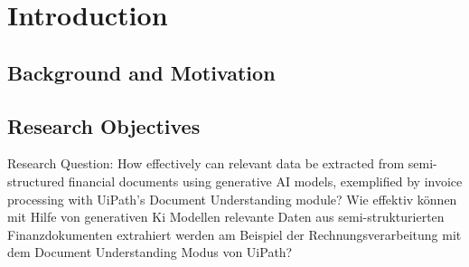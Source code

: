 \chapter{Introduction}

\section{Background and Motivation}
\section{Research Objectives}
Research Question:  
How effectively can relevant data be extracted from semi-structured financial documents using generative AI models, exemplified by invoice processing with UiPath's Document Understanding module?
Wie effektiv können mit Hilfe von generativen Ki Modellen relevante Daten aus semi-strukturierten Finanzdokumenten extrahiert werden am Beispiel der Rechnungsverarbeitung mit dem Document Understanding Modus von UiPath?
